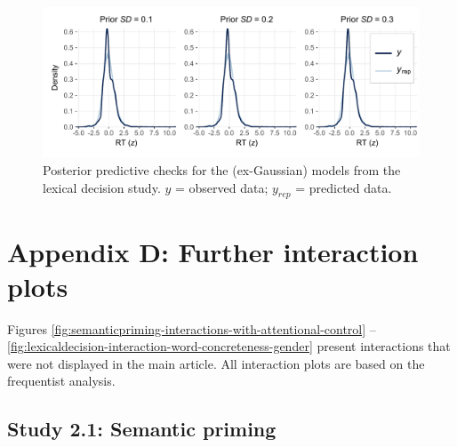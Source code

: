 \documentclass[
  12pt,
  man,floatsintext]{apa7}
\begin{document}
\begin{figure}

{\centering \includegraphics[width=1\linewidth]{../lexicaldecision/bayesian_analysis/posterior_predictive_checks/plots/lexicaldecision_posteriorpredictivechecks_allpriors_exgaussian} 

}

\caption{Posterior predictive checks for the (ex-Gaussian) models from the lexical decision study. \(y\) = observed data; \(y_{rep}\) = predicted data.}\label{fig:lexicaldecision-posteriorpredictivechecks-allpriors-exgaussian}
\end{figure}

\clearpage

\renewcommand{\thefigure}{D\arabic{figure}} \setcounter{figure}{0}
\renewcommand{\thetable}{D\arabic{table}} \setcounter{table}{0}

\hypertarget{appendix-D-interaction-plots}{%
\section{Appendix D: Further interaction plots}\label{appendix-D-interaction-plots}}

Figures \ref{fig:semanticpriming-interactions-with-attentional-control} -- \ref{fig:lexicaldecision-interaction-word-concreteness-gender} present interactions that were not displayed in the main article. All interaction plots are based on the frequentist analysis.

\hypertarget{study-2.1-semantic-priming-3}{%
\subsection{Study 2.1: Semantic priming}\label{study-2.1-semantic-priming-3}}
\end{document}
